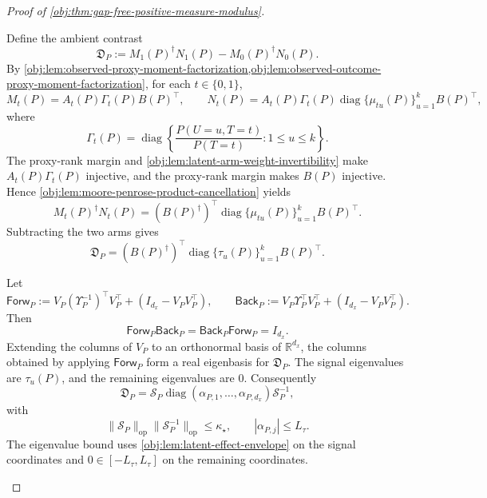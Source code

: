 \begin{proof}[Proof of \cref{obj:thm:gap-free-positive-measure-modulus}]
\begin{enumerate}
Define the ambient contrast
\[
\mathfrak D_P
:=
M_1(P)^\dagger N_1(P)-M_0(P)^\dagger N_0(P).
\]
By \cref{obj:lem:observed-proxy-moment-factorization,obj:lem:observed-outcome-proxy-moment-factorization}, for each \(t\in\{0,1\}\),
\[
M_t(P)=A_t(P)\Gamma_t(P)B(P)^\top,
\qquad
N_t(P)=A_t(P)\Gamma_t(P)
\operatorname{diag}\{\mu_{tu}(P)\}_{u=1}^kB(P)^\top ,
\]
where
\[
\Gamma_t(P)=
\operatorname{diag}\left\{
\frac{P(U=u,T=t)}{P(T=t)}:1\le u\le k
\right\}.
\]
The proxy-rank margin and \cref{obj:lem:latent-arm-weight-invertibility} make
\(A_t(P)\Gamma_t(P)\) injective, and the proxy-rank margin makes \(B(P)\) injective.  Hence
\cref{obj:lem:moore-penrose-product-cancellation} yields
\[
M_t(P)^\dagger N_t(P)
=
(B(P)^\dagger)^\top
\operatorname{diag}\{\mu_{tu}(P)\}_{u=1}^kB(P)^\top .
\]
Subtracting the two arms gives
\[
\mathfrak D_P
=
(B(P)^\dagger)^\top
\operatorname{diag}\{\tau_u(P)\}_{u=1}^kB(P)^\top .
\]

Let
\[
\mathsf{Forw}_P
:=
V_P(\Upsilon_P^{-1})^\top V_P^\top+(I_{d_x}-V_PV_P^\top),
\qquad
\mathsf{Back}_P
:=
V_P\Upsilon_P^\top V_P^\top+(I_{d_x}-V_PV_P^\top).
\]
Then
\[
\mathsf{Forw}_P\mathsf{Back}_P
=
\mathsf{Back}_P\mathsf{Forw}_P
=
I_{d_x}.
\]
Extending the columns of \(V_P\) to an orthonormal basis of \(\mathbb R^{d_x}\), the columns obtained by applying \(\mathsf{Forw}_P\) form a real eigenbasis for \(\mathfrak D_P\).  The signal eigenvalues are \(\tau_u(P)\), and the remaining eigenvalues are \(0\).  Consequently
\begin{equation}
\mathfrak D_P
=
\mathcal S_P\operatorname{diag}(\alpha_{P,1},\ldots,\alpha_{P,d_x})
\mathcal S_P^{-1},
\label{eq:gap-free-model-diagonalization}
\end{equation}
with
\[
\|\mathcal S_P\|_{\mathrm{op}}\|\mathcal S_P^{-1}\|_{\mathrm{op}}
\le \kappa_\star,
\qquad
|\alpha_{P,j}|\le L_\tau .
\]
The eigenvalue bound uses \cref{obj:lem:latent-effect-envelope} on the signal coordinates and \(0\in[-L_\tau,L_\tau]\) on the remaining coordinates.


\end{enumerate}
\end{proof}

